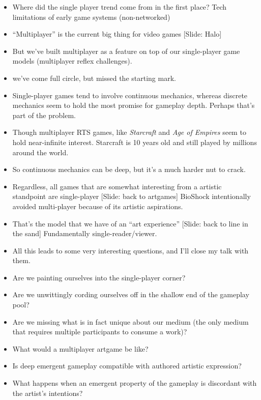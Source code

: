 \documentclass[12pt]{article}
\begin{document}
{\begin{itemize}
\item Where did the single player trend come from in the first place?  Tech limitations of early game systems (non-networked)

\item ``Multiplayer'' is the current big thing for video games [Slide: Halo]

\item But we've built multiplayer as a feature on top of our single-player game models (multiplayer reflex challenges).

\item we've come full circle, but missed the starting mark.

\item Single-player games tend to involve continuous mechanics, whereas discrete mechanics seem to hold the most promise for gameplay depth.  Perhaps that's part of the problem.

\item Though multiplayer RTS games, like {\it Starcraft} and {\it Age of Empires} seem to hold near-infinite interest.  Starcraft is 10 years old and still played by millions around the world.  

\item So continuous mechanics can be deep, but it's a much harder nut to crack.

\item Regardless, all games that are somewhat interesting from a artistic standpoint are single-player [Slide:  back to artgames]  BioShock intentionally avoided multi-player because of its artistic aspirations.

\item That's the model that we have of an ``art experience'' [Slide:  back to line in the sand]  Fundamentally single-reader/viewer.

\item All this leads to some very interesting questions, and I'll close my talk with them.

\item Are we painting ourselves into the single-player corner?

\item Are we unwittingly cording ourselves off in the shallow end of the gameplay pool?

\item Are we missing what is in fact unique about our medium (the only medium that requires multiple participants to consume a work)?

\item What would a multiplayer artgame be like?

\item Is deep emergent gameplay compatible with authored artistic expression?

\item What happens when an emergent property of the gameplay is discordant with the artist's intentions?
 








\end{itemize}
}
\end{document}
